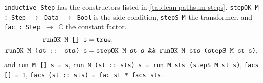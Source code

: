 \begin{definition}\label{def:lean-pathsum-Step}
\textnormal{\texttt{inductive Step}} has the constructors listed in \cref{tab:lean-pathsum-steps}.
\textnormal{\texttt{stepOK M : Step \ensuremath{\to} Data \ensuremath{\to} Bool}} is the side condition, \textnormal{\texttt{stepS M}} the transformer,
and \textnormal{\texttt{fac : Step \ensuremath{\to} \ensuremath{\mathbb{C}}}} the constant factor.
\begin{align*}
\textnormal{\texttt{runOK M [] s}} &= \textnormal{\texttt{true}},\\ \textnormal{\texttt{runOK M (\allowbreak{}st :: sts) s}} &= \textnormal{\texttt{stepOK M st s \&\& runOK M sts (\allowbreak{}stepS M st s)}},\\
\end{align*}
and \textnormal{\texttt{run M [] s = s}}, \textnormal{\texttt{run M (\allowbreak{}st :: sts) s = run M sts (\allowbreak{}stepS M st s)}},
\textnormal{\texttt{facs [] = 1}}, \textnormal{\texttt{facs (\allowbreak{}st :: sts) = fac st * facs sts}}.
\end{definition}

